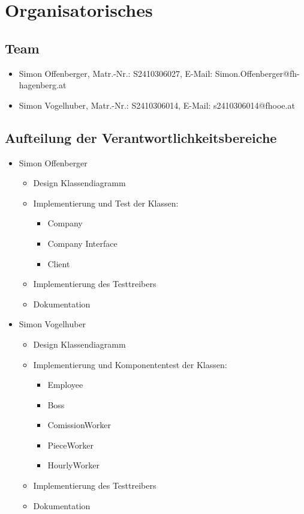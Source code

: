\documentclass[12pt,naustrian,a4widepaper]{scrartcl}
\begin{document}
\section{Organisatorisches}

\subsection{Team}
\begin{itemize}
	\item Simon Offenberger, Matr.-Nr.: S2410306027, E-Mail: Simon.Offenberger@fh-hagenberg.at
	\item Simon Vogelhuber, Matr.-Nr.: S2410306014, E-Mail: s2410306014@fhooe.at	
\end{itemize}

\subsection{Aufteilung der Verantwortlichkeitsbereiche}
\begin{itemize}
	\item Simon Offenberger
		\begin{itemize}
			\item Design Klassendiagramm
			\item Implementierung und Test der Klassen: 
			\begin{itemize}
				\item Company
				\item Company Interface
				\item Client
			\end{itemize}
			\item Implementierung des Testtreibers
			\item Dokumentation
		\end{itemize}
	\item Simon Vogelhuber
		\begin{itemize}
			\item Design Klassendiagramm
			\item Implementierung und Komponententest der Klassen: 
			\begin{itemize}
				\item Employee
				\item Boss
				\item ComissionWorker
				\item PieceWorker
				\item HourlyWorker
			\end{itemize}
			\item Implementierung des Testtreibers
			\item Dokumentation
		\end{itemize}	
\end{itemize}
\end{document}
